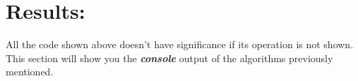 \section{Results:}

All the code shown above doesn't have significance if its operation is not shown. This section will show you the {\bfseries\itshape console} output of the algorithms previously mentioned. \hfill \break
